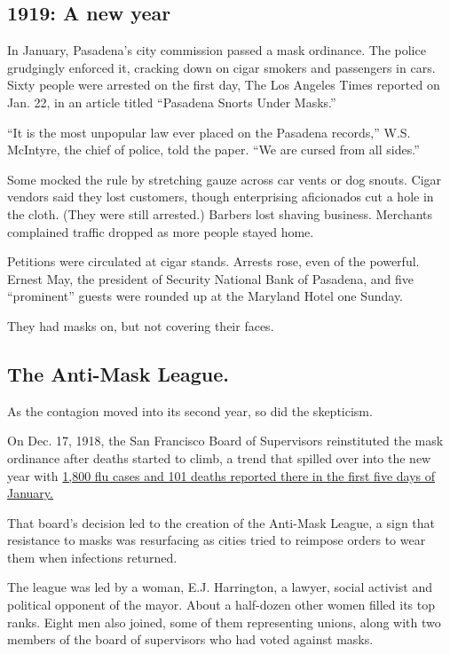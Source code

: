 \hypertarget{1919-a-new-year}{%
\subsection{1919: A new year}\label{1919-a-new-year}}

In January, Pasadena's city commission passed a mask ordinance. The
police grudgingly enforced it, cracking down on cigar smokers and
passengers in cars. Sixty people were arrested on the first day, The Los
Angeles Times reported on Jan. 22, in an article titled ``Pasadena
Snorts Under Masks.''

``It is the most unpopular law ever placed on the Pasadena records,''
W.S. McIntyre, the chief of police, told the paper. ``We are cursed from
all sides.''

Some mocked the rule by stretching gauze across car vents or dog snouts.
Cigar vendors said they lost customers, though enterprising aficionados
cut a hole in the cloth. (They were still arrested.) Barbers lost
shaving business. Merchants complained traffic dropped as more people
stayed home.

Petitions were circulated at cigar stands. Arrests rose, even of the
powerful. Ernest May, the president of Security National Bank of
Pasadena, and five ``prominent'' guests were rounded up at the Maryland
Hotel one Sunday.

They had masks on, but not covering their faces.

\hypertarget{the-anti-mask-league}{%
\subsection{The Anti-Mask League.}\label{the-anti-mask-league}}

As the contagion moved into its second year, so did the skepticism.

On Dec. 17, 1918, the San Francisco Board of Supervisors reinstituted
the mask ordinance after deaths started to climb, a trend that spilled
over into the new year with
\href{https://www.cdc.gov/flu/pandemic-resources/1918-commemoration/pandemic-timeline-1918.htm}{1,800
flu cases and 101 deaths reported there in the first five days of
January.}

That board's decision led to the creation of the Anti-Mask League, a
sign that resistance to masks was resurfacing as cities tried to
reimpose orders to wear them when infections returned.

The league was led by a woman, E.J. Harrington, a lawyer, social
activist and political opponent of the mayor. About a half-dozen other
women filled its top ranks. Eight men also joined, some of them
representing unions, along with two members of the board of supervisors
who had voted against masks.

